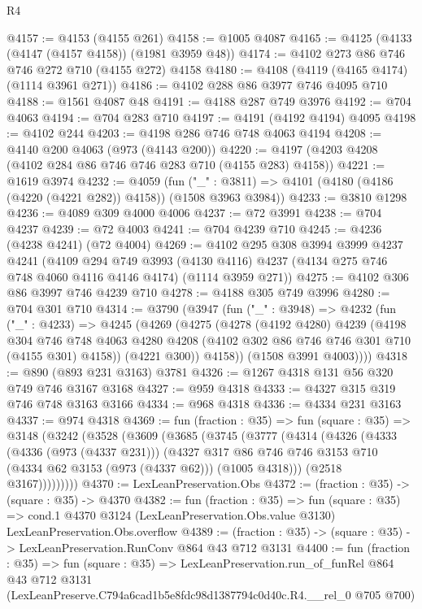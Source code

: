 \begin{lexlean}{R4}
\begin{coremodule}
@4157 := @4153 (@4155 @261)
@4158 := @1005 @4087
@4165 := @4125 (@4133 (@4147 (@4157 @4158)) (@1981 @3959 @48))
@4174 := @4102 @273 @86 @746 @746 @272 @710 (@4155 @272) @4158
@4180 := @4108 (@4119 (@4165 @4174) (@1114 @3961 @271))
@4186 := @4102 @288 @86 @3977 @746 @4095 @710
@4188 := @1561 @4087 @48
@4191 := @4188 @287 @749 @3976
@4192 := @704 @4063
@4194 := @704 @283 @710
@4197 := @4191 (@4192 @4194) @4095
@4198 := @4102 @244
@4203 := @4198 @286 @746 @748 @4063 @4194
@4208 := @4140 @200 @4063 (@973 (@4143 @200))
@4220 := @4197 (@4203 @4208 (@4102 @284 @86 @746 @746 @283 @710 (@4155 @283) @4158))
@4221 := @1619 @3974
@4232 := @4059
    (fun ("_" : @3811) => @4101 (@4180 (@4186 (@4220 (@4221 @282)) @4158)) (@1508 @3963 @3984))
@4233 := @3810 @1298
@4236 := @4089 @309 @4000 @4006
@4237 := @72 @3991
@4238 := @704 @4237
@4239 := @72 @4003
@4241 := @704 @4239 @710
@4245 := @4236 (@4238 @4241) (@72 @4004)
@4269 := @4102
    @295
    @308
    @3994
    @3999
    @4237
    @4241
    (@4109
      @294
      @749
      @3993
      (@4130 @4116)
      @4237
      (@4134 @275 @746 @748 @4060 @4116 @4146 @4174)
      (@1114 @3959 @271))
@4275 := @4102 @306 @86 @3997 @746 @4239 @710
@4278 := @4188 @305 @749 @3996
@4280 := @704 @301 @710
@4314 := @3790
    (@3947
      (fun ("_" : @3948) =>
      @4232
        (fun ("_" : @4233) =>
        @4245
          (@4269
            (@4275
              (@4278
                (@4192 @4280)
                @4239
                (@4198
                  @304
                  @746
                  @748
                  @4063
                  @4280
                  @4208
                  (@4102 @302 @86 @746 @746 @301 @710 (@4155 @301) @4158))
                (@4221 @300))
              @4158))
          (@1508 @3991 @4003))))
@4318 := @890 (@893 @231 @3163) @3781
@4326 := @1267 @4318 @131 @56 @320 @749 @746 @3167 @3168
@4327 := @959 @4318
@4333 := @4327 @315 @319 @746 @748 @3163 @3166
@4334 := @968 @4318
@4336 := @4334 @231 @3163
@4337 := @974 @4318
@4369 := fun (fraction : @35) =>
  fun (square : @35) =>
  @3148
    (@3242
      (@3528
        (@3609
          (@3685
            (@3745
              (@3777
                (@4314
                  (@4326
                    (@4333
                      (@4336 (@973 (@4337 @231)))
                      (@4327
                        @317
                        @86
                        @746
                        @746
                        @3153
                        @710
                        (@4334 @62 @3153 (@973 (@4337 @62)))
                        (@1005 @4318)))
                    (@2518 @3167)))))))))
@4370 := LexLeanPreservation.Obs
@4372 := (fraction : @35) -> (square : @35) -> @4370
@4382 := fun (fraction : @35) =>
  fun (square : @35) =>
  cond.{1} @4370 @3124 (LexLeanPreservation.Obs.value @3130) LexLeanPreservation.Obs.overflow
@4389 := (fraction : @35) -> (square : @35) -> LexLeanPreservation.RunConv @864 @43 @712 @3131
@4400 := fun (fraction : @35) =>
  fun (square : @35) =>
  LexLeanPreservation.run_of_funRel
    @864
    @43
    @712
    @3131
    (LexLeanPreserve.C794a6cad1b5e8fdc98d1387794c0d40c.R4.__rel_0 @705 @700)
\end{coremodule}
\end{lexlean}
